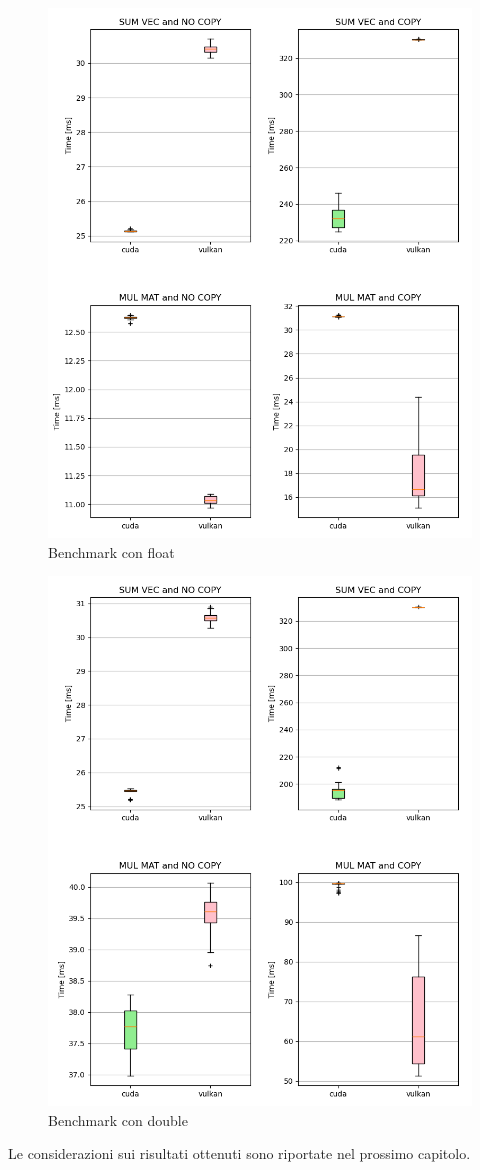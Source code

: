 \begin{figure}[ht]
  \centering
  \includegraphics[width=1\linewidth]{images/chapter4/bench_f32.png}
  \caption{Benchmark con float}
  \label{fig:bench_f32}
\end{figure}

\begin{figure}[ht]
  \centering
  \includegraphics[width=1\linewidth]{images/chapter4/bench_f64.png}
  \caption{Benchmark con double}
  \label{fig:bench_f64}
\end{figure}

Le considerazioni sui risultati ottenuti sono riportate nel prossimo capitolo.
